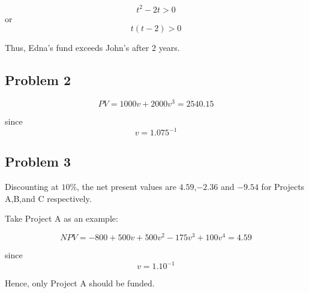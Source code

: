 \documentclass[
]{book}
\begin{document}
\[t^{2}-2t>0\] or \[t(t-2)>0\]

Thus, Edna's fund exceeds John's after 2 years.

\hypertarget{problem-2-1}{%
\subsection*{Problem 2}\label{problem-2-1}}

\[PV=1000v+2000v^{3}=2540.15 \]

since \[v=1.075^{-1}\]

\hypertarget{problem-3-1}{%
\subsection*{Problem 3}\label{problem-3-1}}

Discounting at \(10\%\), the net present values are \(4.59\),\(-2.36\) and \(-9.54\) for Projects A,B,and C respectively.

Take Project A as an example:

\[NPV=-800+500v+500v^{2}-175v^{3}+100v^{4}=4.59\]

since \[v=1.10^{-1}\]

Hence, only Project A should be funded.

  
\end{document}
